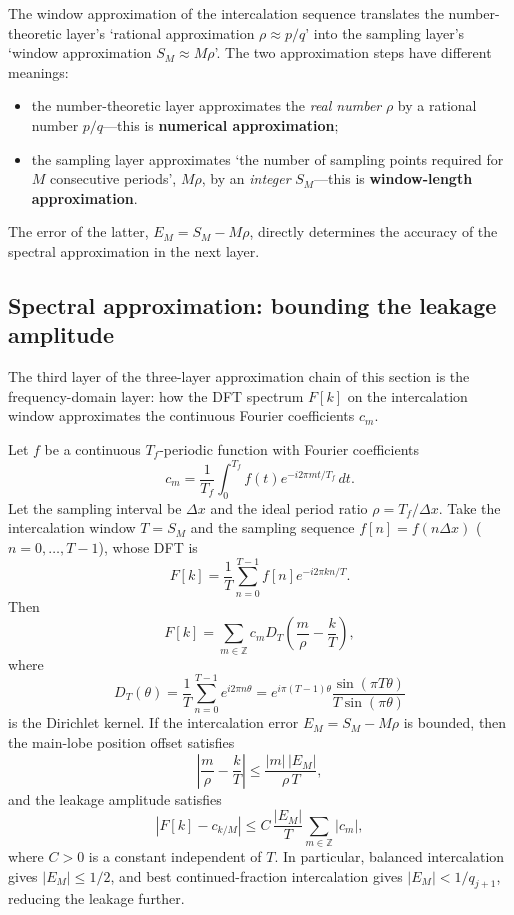 \begin{remark}\label{rem:window_approximation_principle}
The window approximation of the intercalation sequence translates the number-theoretic layer's `rational approximation $\rho\approx p/q$' into the sampling layer's `window approximation $S_M\approx M\rho$'. The two approximation steps have different meanings:
\begin{itemize}
    \item the number-theoretic layer approximates the \emph{real number} $\rho$ by a rational number $p/q$---this is \textbf{numerical approximation};
    \item the sampling layer approximates `the number of sampling points required for $M$ consecutive periods', $M\rho$, by an \emph{integer} $S_M$---this is \textbf{window-length approximation}.
\end{itemize}
The error of the latter, $E_M=S_M-M\rho$, directly determines the accuracy of the spectral approximation in the next layer.
\end{remark}

\subsection{Spectral approximation: bounding the leakage amplitude}

The third layer of the three-layer approximation chain of this section is the frequency-domain layer: how the DFT spectrum $F[k]$ on the intercalation window approximates the continuous Fourier coefficients $c_m$.

\begin{theorem}\label{thm:intercalation_dft_leakage}
Let \(f\) be a continuous \(T_f\)-periodic function with Fourier coefficients
\[
c_m=\frac{1}{T_f}\int_0^{T_f} f(t)e^{-i2\pi mt/T_f}\,dt.
\]
Let the sampling interval be \(\Delta x\) and the ideal period ratio \(\rho=T_f/\Delta x\). Take the intercalation window \(T=S_M\) and the sampling sequence \(f[n]=f(n\Delta x)\) (\(n=0,\dots,T-1\)), whose DFT is
\[
F[k]=\frac{1}{T}\sum_{n=0}^{T-1}f[n]e^{-i2\pi kn/T}.
\]
Then
\[
F[k]=\sum_{m\in\mathbb{Z}} c_m D_T\!\left(\frac{m}{\rho}-\frac{k}{T}\right),
\]
where
\[
D_T(\theta)=\frac{1}{T}\sum_{n=0}^{T-1}e^{i2\pi n\theta}
=e^{i\pi(T-1)\theta}\frac{\sin(\pi T\theta)}{T\sin(\pi\theta)}
\]
is the Dirichlet kernel. If the intercalation error \(E_M=S_M-M\rho\) is bounded, then the main-lobe position offset satisfies
\[
\left|\frac{m}{\rho}-\frac{k}{T}\right|
\le \frac{|m|\,|E_M|}{\rho\,T},
\]
and the leakage amplitude satisfies
\[
|F[k]-c_{k/M}|
\le C\,\frac{|E_M|}{T}\sum_{m\in\mathbb{Z}}|c_m|,
\]
where \(C>0\) is a constant independent of \(T\). In particular, balanced intercalation gives \(|E_M|\le 1/2\), and best continued-fraction intercalation gives \(|E_M|<1/q_{j+1}\), reducing the leakage further.
\end{theorem}


